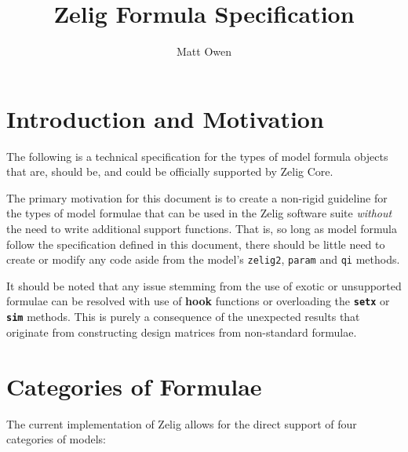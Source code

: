 \documentclass{article}
\title{Zelig Formula Specification}
\author{Matt Owen}
\begin{document}
\maketitle



%
%
%
\section{Introduction and Motivation}
\label{sec:intro}

The following is a technical specification for the types of model formula
objects that are, should be, and could be officially supported by Zelig Core.

The primary motivation for this document is to create a non-rigid guideline for
the types of model formulae that can be used in the Zelig software suite
\emph{without} the need to write additional support functions. That is, so long
as model formula follow the specification defined in this document, there should
be little need to create or modify any code aside from the model's {\tt zelig2},
{\tt param} and {\tt qi} methods.

It should be noted that any issue stemming from the use of exotic or unsupported
formulae can be resolved with use of {\bf hook} functions or overloading the
{\bf \tt setx} or {\bf \tt sim} methods. This is purely a consequence of the
unexpected results that originate from constructing design matrices from
non-standard formulae.



%
%
%
\section{Categories of Formulae}
\label{sec:req}

The current implementation of Zelig allows for the direct support of four
categories of models:
\end{document}
